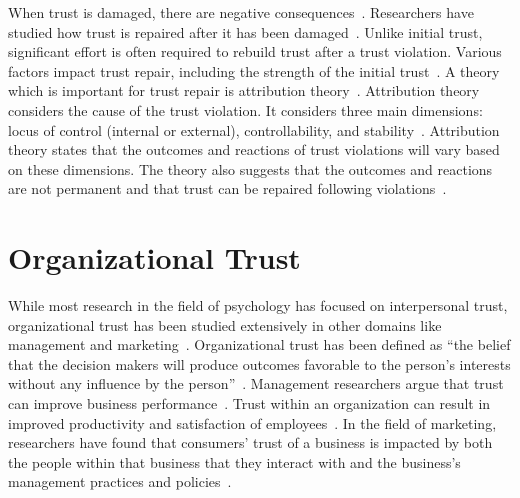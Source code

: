 \documentclass{article}
\begin{document}
When trust is damaged, there are negative consequences~\cite{lewicki1996developing,robinson1996trust}. Researchers have studied how trust is repaired after it has been damaged~\cite{kim2009repair,tomlinson2009role}. Unlike initial trust, significant effort is often required to rebuild trust after a trust violation. Various factors impact trust repair, including the strength of the initial trust~\cite{lewicki2000trust}. A theory which is important for trust repair is attribution theory~\cite{weiner1985attributional}. Attribution theory considers the cause of the trust violation. It considers three main dimensions: locus of control (internal or external), controllability, and stability~\cite{tomlinson2009role}. Attribution theory states that the outcomes and reactions of trust violations will vary based on these dimensions. The theory also suggests that the outcomes and reactions are not permanent and that trust can be repaired following violations~\cite{bansal2015trust}.

\section{Organizational Trust}

While most research in the field of psychology has focused on interpersonal trust, organizational trust has been studied extensively in other domains like management and marketing~\cite{wang2005overview}. Organizational trust has been defined as ``the belief that the decision makers will produce outcomes favorable to the person’s interests without any influence by the person''~\cite{driscoll1978trust}. Management researchers argue that trust can improve business performance~\cite{wang2005overview,sako2006does}. Trust within an organization can result in improved productivity and satisfaction of employees~\cite{mayer1995integrative}. In the field of marketing, researchers have found that consumers' trust of a business is impacted by both the people within that business that they interact with and the business's management practices and policies~\cite{sirdeshmukh2002consumer}. 
\end{document}

